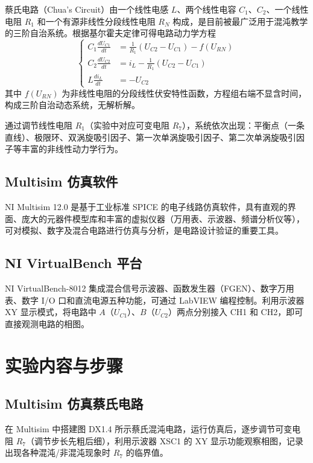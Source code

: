 \documentclass[a4paper,8pt,twocolumn]{article}
\begin{document}
蔡氏电路（Chua's Circuit）由一个线性电感 $L$、两个线性电容 $C_1$、$C_2$、一个线性电阻 $R_1$ 和一个有源非线性分段线性电阻 $R_N$ 构成，是目前被最广泛用于混沌教学的三阶自治系统。根据基尔霍夫定律可得电路动力学方程
\begin{equation}
  \left\{
  \begin{aligned}
    C_1\frac{dU_{C1}}{dt} &= \frac{1}{R_1}(U_{C2}-U_{C1}) - f(U_{RN})\\[4pt]
    C_2\frac{dU_{C2}}{dt} &= i_L - \frac{1}{R_1}(U_{C2}-U_{C1})\\[4pt]
    L\frac{di_L}{dt} &= -U_{C2}
  \end{aligned}
  \right.
  \tag{DX1.1}
\end{equation}
其中 $f(U_{RN})$ 为非线性电阻的分段线性伏安特性函数，方程组右端不显含时间，构成三阶自治动态系统，无解析解。

通过调节线性电阻 $R_1$（实验中对应可变电阻 $R_7$），系统依次出现：平衡点（一条直线）、极限环、双涡旋吸引因子、第一次单涡旋吸引因子、第二次单涡旋吸引因子等丰富的非线性动力学行为。

\subsection{Multisim 仿真软件}

NI Multisim 12.0 是基于工业标准 SPICE 的电子线路仿真软件，具有直观的界面、庞大的元器件模型库和丰富的虚拟仪器（万用表、示波器、频谱分析仪等），可对模拟、数字及混合电路进行仿真与分析，是电路设计验证的重要工具。

\subsection{NI VirtualBench 平台}

NI VirtualBench-8012 集成混合信号示波器、函数发生器（FGEN）、数字万用表、数字 I/O 口和直流电源五种功能，可通过 LabVIEW 编程控制。利用示波器 XY 显示模式，将电路中 $A$（$U_{C1}$）、$B$（$U_{C2}$）两点分别接入 CH1 和 CH2，即可直接观测电路的相图。

\section{实验内容与步骤}

\subsection{Multisim 仿真蔡氏电路}

在 Multisim 中搭建图 DX1.4 所示蔡氏混沌电路，运行仿真后，逐步调节可变电阻 $R_7$（调节步长先粗后细），利用示波器 XSC1 的 XY 显示功能观察相图，记录出现各种混沌/非混沌现象时 $R_7$ 的临界值。
\end{document}
